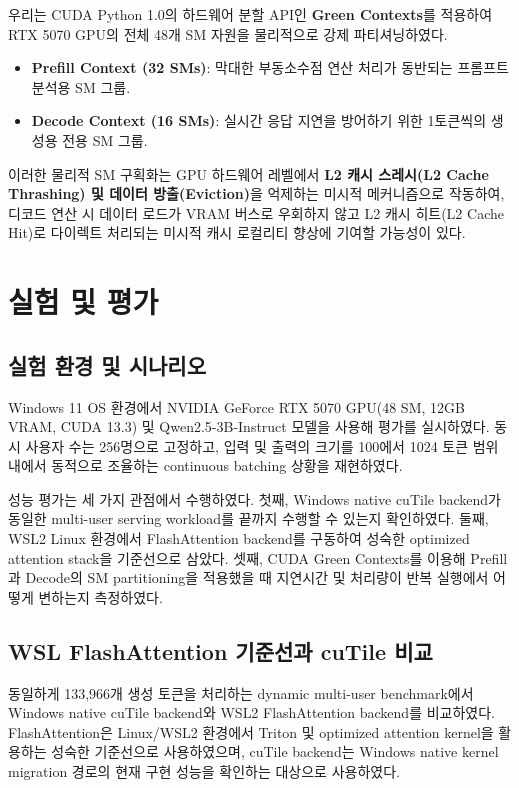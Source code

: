 \documentclass{kcc} %
\begin{document}
우리는 CUDA Python 1.0의 하드웨어 분할 API인 \textbf{Green Contexts}를 적용하여 RTX 5070 GPU의 전체 48개 SM 자원을 물리적으로 강제 파티셔닝하였다.


\begin{itemize}
\item \textbf{Prefill Context (32 SMs)}: 막대한 부동소수점 연산 처리가 동반되는 프롬프트 분석용 SM 그룹.
\item \textbf{Decode Context (16 SMs)}: 실시간 응답 지연을 방어하기 위한 1토큰씩의 생성용 전용 SM 그룹.
\end{itemize}


이러한 물리적 SM 구획화는 GPU 하드웨어 레벨에서 \textbf{L2 캐시 스레시(L2 Cache Thrashing) 및 데이터 방출(Eviction)}을 억제하는 미시적 메커니즘으로 작동하여, 디코드 연산 시 데이터 로드가 VRAM 버스로 우회하지 않고 L2 캐시 히트(L2 Cache Hit)로 다이렉트 처리되는 미시적 캐시 로컬리티 향상에 기여할 가능성이 있다.


\section{실험 및 평가}

\subsection{실험 환경 및 시나리오}

Windows 11 OS 환경에서 NVIDIA GeForce RTX 5070 GPU(48 SM, 12GB VRAM, CUDA 13.3) 및 Qwen2.5-3B-Instruct 모델을 사용해 평가를 실시하였다. 동시 사용자 수는 256명으로 고정하고, 입력 및 출력의 크기를 100에서 1024 토큰 범위 내에서 동적으로 조율하는 continuous batching 상황을 재현하였다.


성능 평가는 세 가지 관점에서 수행하였다. 첫째, Windows native cuTile backend가 동일한 multi-user serving workload를 끝까지 수행할 수 있는지 확인하였다. 둘째, WSL2 Linux 환경에서 FlashAttention backend를 구동하여 성숙한 optimized attention stack을 기준선으로 삼았다. 셋째, CUDA Green Contexts를 이용해 Prefill과 Decode의 SM partitioning을 적용했을 때 지연시간 및 처리량이 반복 실행에서 어떻게 변하는지 측정하였다.


\subsection{WSL FlashAttention 기준선과 cuTile 비교}

동일하게 133,966개 생성 토큰을 처리하는 dynamic multi-user benchmark에서 Windows native cuTile backend와 WSL2 FlashAttention backend를 비교하였다. FlashAttention은 Linux/WSL2 환경에서 Triton 및 optimized attention kernel을 활용하는 성숙한 기준선으로 사용하였으며, cuTile backend는 Windows native kernel migration 경로의 현재 구현 성능을 확인하는 대상으로 사용하였다.
\end{document}

